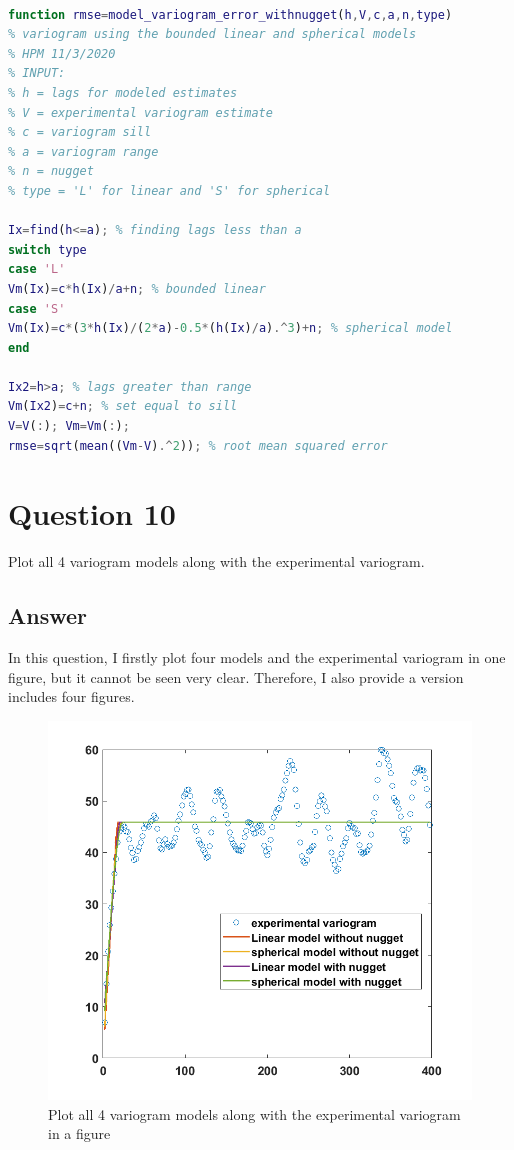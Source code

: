 \documentclass[
	12pt, %
]{fphw}
\begin{document}
 \begin{lstlisting}[language=Matlab,escapeinside=``]
 
function rmse=model_variogram_error_withnugget(h,V,c,a,n,type)
% variogram using the bounded linear and spherical models
% HPM 11/3/2020
% INPUT:
% h = lags for modeled estimates
% V = experimental variogram estimate
% c = variogram sill
% a = variogram range
% n = nugget
% type = 'L' for linear and 'S' for spherical

Ix=find(h<=a); % finding lags less than a
switch type
case 'L'
Vm(Ix)=c*h(Ix)/a+n; % bounded linear
case 'S'
Vm(Ix)=c*(3*h(Ix)/(2*a)-0.5*(h(Ix)/a).^3)+n; % spherical model
end

Ix2=h>a; % lags greater than range
Vm(Ix2)=c+n; % set equal to sill
V=V(:); Vm=Vm(:);
rmse=sqrt(mean((Vm-V).^2)); % root mean squared error

\end{lstlisting}

\clearpage
 
 \section*{Question 10 }
 
 \begin{problem}
Plot all 4 variogram models along with the experimental variogram.
 	
 \end{problem}
 
 \subsection*{Answer}
 In this question, I firstly plot four models and the experimental variogram in one figure, but it cannot be seen very clear. Therefore, I also provide a version includes four figures.
 
 \begin{figure}[htbp]
	\centering
	\includegraphics[width=0.6\columnwidth]{Q10_1.png} 
	\caption{Plot all 4 variogram models along with the experimental variogram in a figure }
\end{figure}
 
\end{document}
